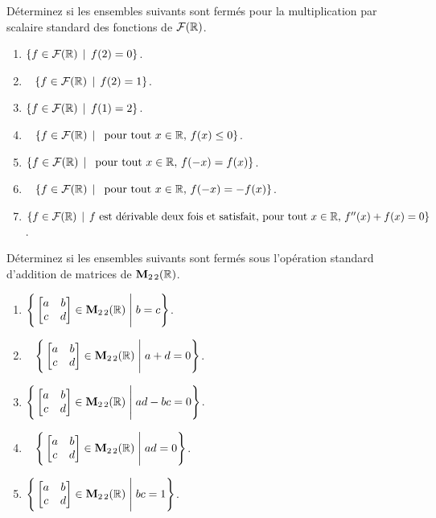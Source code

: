 \begin{prob} \label{prob04.4} Déterminez si les
ensembles suivants sont fermés pour la multiplication par scalaire standard 
 des fonctions de $\mathcal{F}(\mathbb{R})$.

\begin{enumerate}
\item
  $\{f \in \mathcal{F}(\mathbb{R}) \, \mid \, f(2)=0 \}$.
\item\sov~
  $\{f \in \mathcal{F}(\mathbb{R}) \, \mid \, f(2)=1 \}$.
\item
  $\{f \in \mathcal{F}(\mathbb{R}) \, \mid \, f(1)=2 \}$.
\item\sov~
  $\{f \in \mathcal{F}(\mathbb{R}) \, \mid \, \text{ pour tout } x\in \mathbb{R},   \, f(x)\le 0\}$.
\item
  $\{f \in \mathcal{F}(\mathbb{R}) \, \mid \, \text{ pour tout } x\in \mathbb{R},   \, f(-x)= f(x)\}$.
\item\sov~
  $\{f \in \mathcal{F}(\mathbb{R}) \, \mid \, \text{ pour tout } x\in \mathbb{R},   \, f(-x)= -f(x)\}$.
\item
  $\{f \in \mathcal{F}(\mathbb{R})   \, \mid \, \text{$f$ est dérivable deux fois et satisfait, pour tout  } x\in \mathbb{R},   \, f''(x)+ f(x)=0\}$.
\end{enumerate}
\end{prob}

\begin{prob} \label{prob04.5} Déterminez si les
ensembles suivants sont fermés sous l'opération standard d'addition de
matrices de $\mathbf{M}_{2 \,2}(\mathbb{R})$.

\begin{enumerate}
\item
  $\Bigg\{  \bmatrix a&b\\ c&d\endbmatrix \in \M_{2 \,2}(\R) \;\Bigg|\; b=c\Bigg\}$.
\item\sov~
  $\Bigg\{  \bmatrix a&b\\ c&d\endbmatrix \in \M_{2 \,2}(\R) \;\Bigg|\; a+d=0\Bigg\}$.
\item
  $\Bigg\{  \bmatrix a&b\\ c&d\endbmatrix \in \M_{2 \,2}(\R) \;\Bigg|\; ad-bc=0\Bigg\}$.
\item\sov~
  $\Bigg\{  \bmatrix a&b\\ c&d\endbmatrix \in \M_{2 \,2}(\R) \;\Bigg|\; ad=0\Bigg\}$.
\item
  $\Bigg\{  \bmatrix a&b\\ c&d\endbmatrix \in \M_{2 \,2}(\R) \;\Bigg|\; bc=1\Bigg\}$.
\end{enumerate}
\end{prob}

